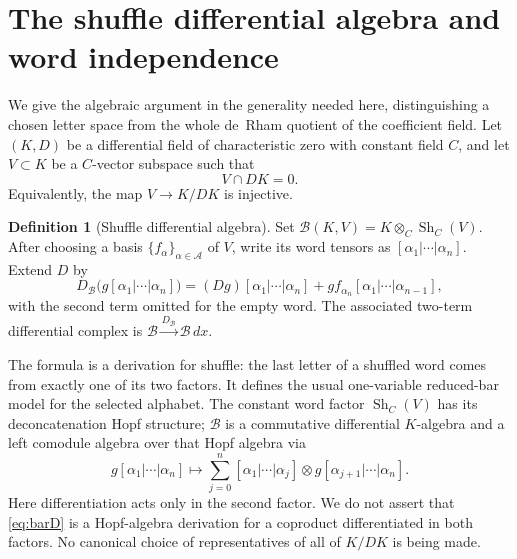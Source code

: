 \documentclass[11pt]{article}
\numberwithin{equation}{section}
\theoremstyle{definition}
\newtheorem{definition}[definition]{Definition}
\theoremstyle{remark}
\newcommand{\dd}{\,d}
\newcommand{\Sh}{\operatorname{Sh}}
\newcommand{\calB}{\mathcal B}
\begin{document}
\section{The shuffle differential algebra and word independence}\label{sec:bar}

We give the algebraic argument in the generality needed here, distinguishing
a chosen letter space from the whole de~Rham quotient of the coefficient
field. Let $(K,D)$ be a differential field of characteristic zero with
constant field $C$, and let $V\subset K$ be a $C$-vector subspace such that
\begin{equation}\label{eq:Vcondition}
 V\cap DK=0.
\end{equation}
Equivalently, the map $V\to K/DK$ is injective.

\begin{definition}[Shuffle differential algebra]\label{def:bar}
Set $\calB(K,V)=K\otimes_C\Sh_C(V)$. After choosing a basis
$\{f_\alpha\}_{\alpha\in\mathscr A}$ of $V$, write its word tensors as
$[\alpha_1|\cdots|\alpha_n]$. Extend $D$ by
\begin{equation}\label{eq:barD}
 D_{\calB}\bigl(g[\alpha_1|\cdots|\alpha_n]\bigr)
 =(Dg)[\alpha_1|\cdots|\alpha_n]
 +g f_{\alpha_n}[\alpha_1|\cdots|\alpha_{n-1}],
\end{equation}
with the second term omitted for the empty word.
The associated two-term differential complex is
$\calB\xrightarrow{D_{\calB}}\calB\dd x$.
\end{definition}

The formula is a derivation for shuffle: the last letter of a shuffled word
comes from exactly one of its two factors. It defines the usual
one-variable reduced-bar model for the selected alphabet. The constant word
factor $\Sh_C(V)$ has its deconcatenation Hopf structure; $\calB$ is a
commutative differential $K$-algebra and a left comodule algebra over that
Hopf algebra via
\begin{equation}\label{eq:coaction}
 g[\alpha_1|\cdots|\alpha_n]\longmapsto
 \sum_{j=0}^n[\alpha_1|\cdots|\alpha_j]\otimes
 g[\alpha_{j+1}|\cdots|\alpha_n].
\end{equation}
Here differentiation acts only in the second factor. We do not assert that
\eqref{eq:barD} is a Hopf-algebra derivation for a coproduct differentiated in
both factors. No canonical choice of representatives of all of $K/DK$ is
being made.
\end{document}
